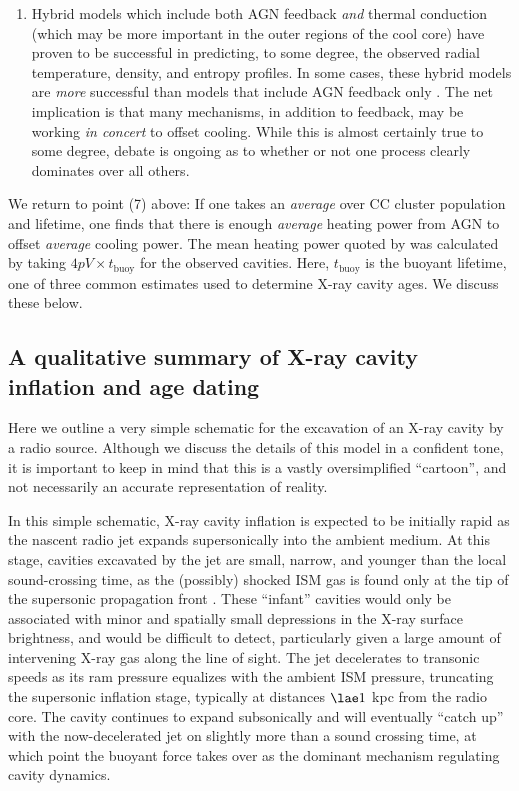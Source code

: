 \begin{enumerate}
\item Hybrid models which include both AGN feedback {\it and} thermal conduction (which may be more important 
in the outer regions of the cool core) have proven to be successful in predicting, to some degree, the observed radial temperature, 
density, and entropy profiles. In some cases, these hybrid models are {\it more} successful than models that include AGN feedback only \citep{ruszkowski02,brighenti03,voit05}. The net implication is that many mechanisms, in addition to feedback, may be working {\it in concert} 
to offset cooling. While this is almost certainly true to some degree, debate is ongoing as to whether or not one process 
clearly dominates over all others.  

\end{enumerate}


We return to point (7) above: If one takes an {\it average} over CC cluster population and lifetime, one finds that there is enough 
{\it average} heating power from AGN to offset {\it average} cooling power. The mean heating power quoted by \citet{rafferty06}
was calculated by taking $4pV \times t_\mathrm{buoy}$ for the observed cavities. Here,  $t_\mathrm{buoy}$ is the buoyant lifetime, 
one of three common estimates used to determine X-ray cavity ages. We discuss 
these below. 


\subsection{A qualitative summary of X-ray cavity inflation and age dating}

Here we outline a very simple schematic for the excavation of an X-ray cavity 
by a radio source. Although we discuss the details of this model in a confident tone, it is important 
to keep in mind that this is a vastly oversimplified ``cartoon'', and not necessarily an 
accurate representation of reality. 


In this simple schematic, X-ray cavity inflation is expected to be initially rapid as the nascent 
radio jet expands supersonically into the ambient medium. 
At this stage, cavities excavated by the jet are small, narrow, and younger than the local sound-crossing time, 
as the (possibly) shocked ISM gas is found only at the 
tip of the supersonic propagation front  \citep{heinz98,ensslin02,mcnamara07}. 
These ``infant'' cavities would only be associated with minor and spatially small depressions in the X-ray surface brightness, 
and would be difficult to detect, particularly given a large amount of intervening X-ray gas along the line of sight.  
The jet decelerates to transonic speeds as its ram pressure 
equalizes with the ambient ISM pressure, truncating the supersonic inflation stage, typically 
at distances $\lae 1$ kpc from the radio core.  
The cavity continues to expand subsonically and will eventually ``catch up'' with the now-decelerated jet on 
slightly more than a sound crossing time, at which point the buoyant force 
takes over as the dominant mechanism regulating cavity dynamics. 

